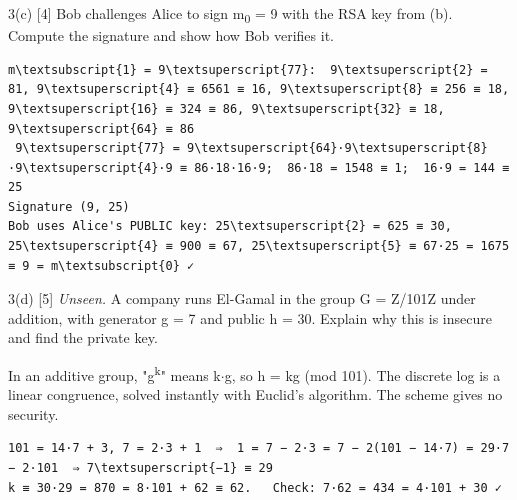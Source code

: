 \documentclass[11pt,a4paper]{article}
\begin{document}
\begin{question}{3(c) \hfill\textnormal{\small [4]}}
Bob challenges Alice to sign m\textsubscript{0} = 9 with the RSA key from (b). Compute the signature and show how Bob verifies it.\par
\end{question}
\begin{answer}
\begin{workbox}
\begin{Verbatim}[commandchars=\\\{\},fontsize=\scriptsize]
m\textsubscript{1} = 9\textsuperscript{77}:  9\textsuperscript{2} = 81, 9\textsuperscript{4} ≡ 6561 ≡ 16, 9\textsuperscript{8} ≡ 256 ≡ 18, 9\textsuperscript{16} ≡ 324 ≡ 86, 9\textsuperscript{32} ≡ 18, 9\textsuperscript{64} ≡ 86
 9\textsuperscript{77} = 9\textsuperscript{64}·9\textsuperscript{8}·9\textsuperscript{4}·9 ≡ 86·18·16·9;  86·18 = 1548 ≡ 1;  16·9 = 144 ≡ 25
Signature (9, 25)
Bob uses Alice's PUBLIC key: 25\textsuperscript{2} = 625 ≡ 30, 25\textsuperscript{4} ≡ 900 ≡ 67, 25\textsuperscript{5} ≡ 67·25 = 1675 ≡ 9 = m\textsubscript{0} ✓
\end{Verbatim}
\end{workbox}
\end{answer}
\begin{question}{3(d) \hfill\textnormal{\small [5]}}
\textit{Unseen.} A company runs El-Gamal in the group G = Z/101Z under addition, with generator g = 7 and public h = 30. Explain why this is insecure and find the private key.\par
\end{question}
\begin{answer}
In an additive group, "g\textsuperscript{k}" means k\ensuremath{\cdot}g, so h = kg (mod 101). The discrete log is a linear congruence, solved instantly with Euclid's algorithm. The scheme gives no security.\par
\begin{workbox}
\begin{Verbatim}[commandchars=\\\{\},fontsize=\scriptsize]
101 = 14·7 + 3, 7 = 2·3 + 1  ⇒  1 = 7 − 2·3 = 7 − 2(101 − 14·7) = 29·7 − 2·101  ⇒ 7\textsuperscript{−1} ≡ 29
k ≡ 30·29 = 870 = 8·101 + 62 ≡ 62.   Check: 7·62 = 434 = 4·101 + 30 ✓
\end{Verbatim}
\end{workbox}
\end{answer}
\end{document}
